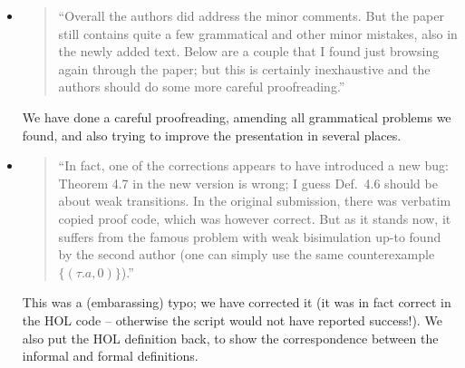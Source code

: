 \begin{itemize}


\item \begin{quote}
``Overall the authors did address the minor comments. But the paper
still contains quite a few grammatical and other minor mistakes, also
in the newly added text. Below are a couple that I found just browsing
again through the paper; but this is certainly inexhaustive and the
authors should do some more careful proofreading.''
\end{quote}
\Mark
 We have done a  careful proofreading,   amending all 
grammatical problems we found, and also trying to improve the
presentation in several places. 

\item \begin{quote}
    ``In fact, one of the corrections appears to have introduced a new
    bug: Theorem 4.7 in the new version is wrong; I guess Def.~4.6
    should be about weak transitions. In the original submission,
    there was verbatim copied proof code, which was however
    correct. But as it stands now, it suffers from the famous problem
    with weak bisimulation up-to found by the second author (one can
    simply use the same counterexample $\{(\tau. a , 0)\}$).''
  \end{quote}
  \Mark
  This was a (embarassing) typo; we have corrected it (it was in fact correct in the HOL
  code -- otherwise the script would not have reported success!). 
We also put the HOL definition back, to show the correspondence between the informal and formal definitions.


\end{itemize}
